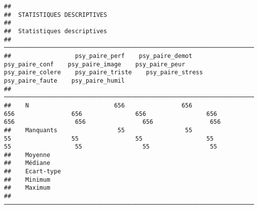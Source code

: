 \documentclass[
]{article}
\begin{document}
\begin{verbatim}
## 
##  STATISTIQUES DESCRIPTIVES
## 
##  Statistiques descriptives                                                                                                                                                                                    
##  ──────────────────────────────────────────────────────────────────────────────────────────────────────────────────────────────────────────────────────────────────────────────────────────────────────────── 
##                  psy_paire_perf    psy_paire_demot    psy_paire_conf    psy_paire_image    psy_paire_peur    psy_paire_colere    psy_paire_triste    psy_paire_stress    psy_paire_faute    psy_paire_humil   
##  ──────────────────────────────────────────────────────────────────────────────────────────────────────────────────────────────────────────────────────────────────────────────────────────────────────────── 
##    N                        656                656               656                656               656                 656                 656                 656                656                656   
##    Manquants                 55                 55                55                 55                55                  55                  55                  55                 55                 55   
##    Moyenne                                                                                                                                                                                                    
##    Médiane                                                                                                                                                                                                    
##    Ecart-type                                                                                                                                                                                                 
##    Minimum                                                                                                                                                                                                    
##    Maximum                                                                                                                                                                                                    
##  ──────────────────────────────────────────────────────────────────────────────────────────────────────────────────────────────────────────────────────────────────────────────────────────────────────────── 

\end{verbatim}
\end{document}

